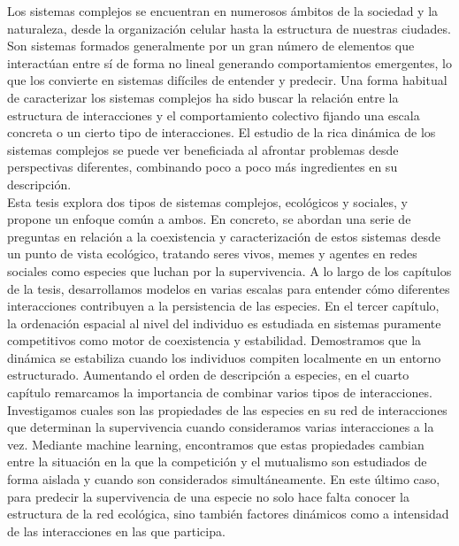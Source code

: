 Los sistemas complejos se encuentran en numerosos ámbitos de la sociedad y la naturaleza, desde la organización celular hasta la estructura de nuestras ciudades. Son sistemas formados generalmente por un gran número de elementos que interactúan entre sí de forma no lineal generando comportamientos emergentes, lo que los convierte en sistemas difíciles de entender y predecir. Una forma habitual de caracterizar los sistemas complejos ha sido buscar la relación entre la estructura de interacciones y el comportamiento colectivo fijando una escala concreta o un cierto tipo de interacciones. El estudio de la rica dinámica de los sistemas complejos se puede ver beneficiada al afrontar problemas desde perspectivas diferentes, combinando poco a poco más ingredientes en su descripción. \\

Esta tesis explora dos tipos de sistemas complejos, ecológicos y sociales, y propone un enfoque común a ambos. En concreto, se abordan una serie de preguntas en relación a la coexistencia y caracterización de estos sistemas desde un punto de vista ecológico, tratando seres vivos, memes y agentes en redes sociales como especies que luchan por la supervivencia. A lo largo de los capítulos de la tesis, desarrollamos modelos en varias escalas para entender cómo diferentes interacciones contribuyen a la persistencia de las especies. En el tercer capítulo, la ordenación espacial al nivel del individuo es estudiada en sistemas puramente competitivos como motor de coexistencia y estabilidad. Demostramos que la dinámica se estabiliza cuando los individuos compiten localmente en un entorno estructurado. Aumentando el orden de descripción a especies, en el cuarto capítulo remarcamos la importancia de combinar varios tipos de interacciones. Investigamos cuales son las propiedades de las especies en su red de interacciones que determinan la supervivencia cuando consideramos varias interacciones a la vez. Mediante machine learning, encontramos que estas propiedades cambian entre la situación en la que la competición y el mutualismo son estudiados de forma aislada y cuando son considerados simultáneamente. En este último caso, para predecir la supervivencia de una especie no solo hace falta conocer la estructura de la red ecológica, sino también factores dinámicos como a intensidad de las interacciones en las que participa. \\

